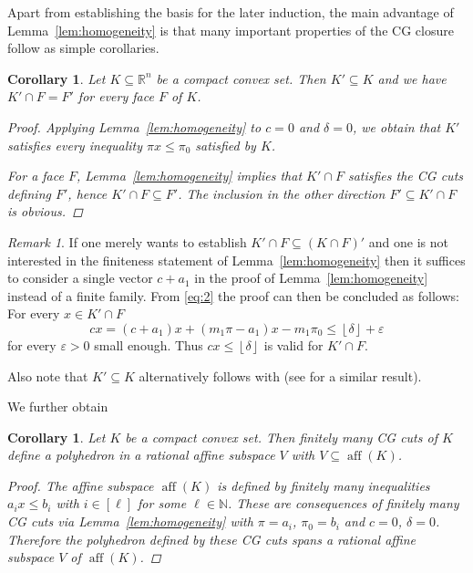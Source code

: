 \documentclass[11pt]{article}
\newtheorem{cor}[thm]{Corollary}
\theoremstyle{remark}
\newtheorem{rem}{Remark}
\begin{document}
Apart from establishing the basis for the later induction, the main
advantage of Lemma~\ref{lem:homogeneity} is that many
important properties of the {CG\xspace} closure follow as simple corollaries.

\begin{cor}
  \label{cor:face}
  Let \(K \subseteq {\mathbb{R}}^n\) be a compact convex set.
  Then \(K' \subseteq K\) and we have \(K' \cap F = F'\) for every face \(F\) of \(K\).
\begin{proof}
Applying Lemma~\ref{lem:homogeneity} to \(c = 0\) and \(\delta =0\),
we obtain that \(K'\) satisfies
every inequality \(\pi x \leq \pi_{0}\) satisfied by \(K\).

For a face \(F\), Lemma~\ref{lem:homogeneity} implies that \(K' \cap F\)
satisfies the {CG\xspace} cuts defining \(F'\),
hence \(K' \cap F \subseteq F'\).
The inclusion in the other direction \(F' \subseteq K' \cap F\)
is obvious.
\end{proof}
\end{cor}

\begin{rem}
If one merely
wants to establish \(K' \cap F \subseteq (K \cap F)'\) and one is not interested in
the finiteness statement of Lemma~\ref{lem:homogeneity}
then it suffices to consider a single vector \(c + a_1\)
in the proof of Lemma~\ref{lem:homogeneity}
instead of a finite family.
From \eqref{eq:2} the proof can then be concluded as
follows: For every \(x \in K' \cap F\) 
\begin{equation*}
  c x = (c + a_1) x + (m_1 \pi - a_1) x - m_1 \pi_{0}
  \leq {\left\lfloor{\delta}\right\rfloor} + \varepsilon
\end{equation*}
for every \(\varepsilon > 0\) small enough.
Thus \(c x \leq {\left\lfloor{\delta}\right\rfloor}\) is valid for \(K' \cap F\).

Also note that \(K' \subseteq K\) alternatively follows with \cite[Lemma
2]{DeyP2010} (see \cite{Dadush:de:vi:10} for a similar result).
\end{rem}

We further obtain

\begin{cor}
  \label{cor:bringIntoRationalSpace}
  Let \(K\) be a compact convex set.
  Then finitely many {CG\xspace} cuts of \(K\) define
  a polyhedron in a rational affine subspace \(V\)
  with \(V \subseteq {\operatorname{aff}({K})}\).
\begin{proof}
The affine subspace \({\operatorname{aff}({K})}\) is defined by
finitely many inequalities \(a_i x \leq  b_i\)
with \(i \in [\ell]\) for some
\(\ell \in {\mathbb{N}}\).
These are consequences of finitely many {CG\xspace} cuts
via Lemma~\ref{lem:homogeneity} with \(\pi = a_i\), \(\pi_0 = b_i\)
and \(c = 0\), \(\delta = 0\).
Therefore the polyhedron defined by these {CG\xspace} cuts spans
a rational affine subspace \(V\) of \({\operatorname{aff}({K})}\).
\end{proof}
\end{cor}
\end{document}

